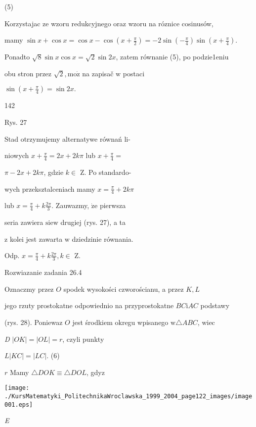 \documentclass[a4paper,12pt]{article}
\begin{document}
(5)

Korzystajac ze wzoru redukcyjnego oraz wzoru na róznice cosinusów,

mamy $\sin x+\cos x = \displaystyle \cos x-\cos(x+\frac{\pi}{2}) = -2\displaystyle \sin(-\frac{\pi}{4})\sin(x+\frac{\pi}{4}).$

Ponadto $\sqrt{8}\sin x\cos x = \sqrt{2}\sin 2x$, zatem równanie (5), po podzie1eniu

obu stron przez $\sqrt{2}, \mathrm{m}\mathrm{o}\dot{\mathrm{z}}$ na zapisač $\mathrm{w}$ postaci

$\displaystyle \sin(x+\frac{\pi}{4})=\sin 2x.$





142

Rys. 27

Stad otrzymujemy alternatywe równań li-

niowych $x+\displaystyle \frac{\pi}{4} =  2x+2k\pi$ lub $x+\displaystyle \frac{\pi}{4} =$

$\pi-2x+2k\pi$, gdzie $k \in$ Z. Po standardo-

wych przeksztalceniach mamy $x= \displaystyle \frac{\pi}{4}+2k\pi$

lub $x = \displaystyle \frac{\pi}{4}+k\frac{2\pi}{3}$. Zauwazmy, $\dot{\mathrm{z}}\mathrm{e}$ pierwsza

seria zawiera $\mathrm{s}\mathrm{i}\mathrm{e} \mathrm{w}$ drugiej (rys. 27), a ta

$\mathrm{z}$ kolei jest zawarta $\mathrm{w}$ dziedzinie równania.

Odp. $x=\displaystyle \frac{\pi}{4}+k\frac{2\pi}{3},  k\in$ Z.

Rozwiazanie zadania 26.4

Oznaczmy przez $O$ spodek wysokości czworościanu, a przez $K, L$

jego rzuty prostokatne odpowiednio na przyprostokatne $BC\mathrm{i}AC$ podstawy

(rys. 28). Poniewaz $O$ jest środkiem okregu wpisanego $\mathrm{w} \triangle ABC$, wiec

{\it D} $|OK| = |OL| = r$, czyli punkty

$L |KC|=|LC|$.   (6)

$r$ Mamy $\triangle DOK \equiv \triangle DOL$, gdyz
\begin{center}
\texttt{[image: ./KursMatematyki\_PolitechnikaWroclawska\_1999\_2004\_page122\_images/image001.eps]}
\end{center}
{\it E}
\end{document}
